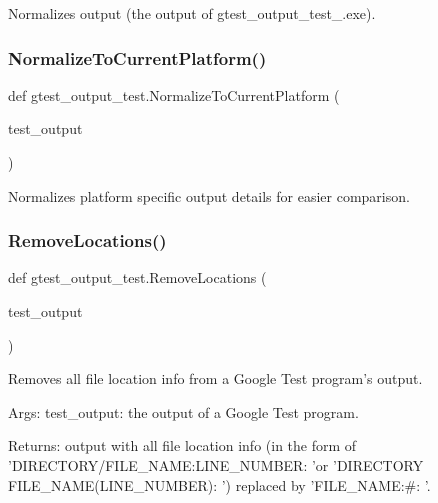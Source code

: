 \begin{DoxyVerb}Normalizes output (the output of gtest_output_test_.exe).\end{DoxyVerb}
 \mbox{\label{namespacegtest__output__test_a597325056856f8805a518c2952a3233e}} 
\subsubsection{\texorpdfstring{Normalize\+To\+Current\+Platform()}{NormalizeToCurrentPlatform()}}
{\footnotesize\ttfamily def gtest\+\_\+output\+\_\+test.\+Normalize\+To\+Current\+Platform (\begin{DoxyParamCaption}\item[{}]{test\+\_\+output }\end{DoxyParamCaption})}

\begin{DoxyVerb}Normalizes platform specific output details for easier comparison.\end{DoxyVerb}
 \mbox{\label{namespacegtest__output__test_ad5ff97e572c5ef7aaf1a414eb52282cf}} 
\subsubsection{\texorpdfstring{Remove\+Locations()}{RemoveLocations()}}
{\footnotesize\ttfamily def gtest\+\_\+output\+\_\+test.\+Remove\+Locations (\begin{DoxyParamCaption}\item[{}]{test\+\_\+output }\end{DoxyParamCaption})}

\begin{DoxyVerb}Removes all file location info from a Google Test program's output.

Args:
     test_output:  the output of a Google Test program.

Returns:
     output with all file location info (in the form of
     'DIRECTORY/FILE_NAME:LINE_NUMBER: 'or
     'DIRECTORY\\FILE_NAME(LINE_NUMBER): ') replaced by
     'FILE_NAME:#: '.
\end{DoxyVerb}
 \mbox{\label{namespacegtest__output__test_ad1c5969bc410dc44be069ab453ce8840}} 

